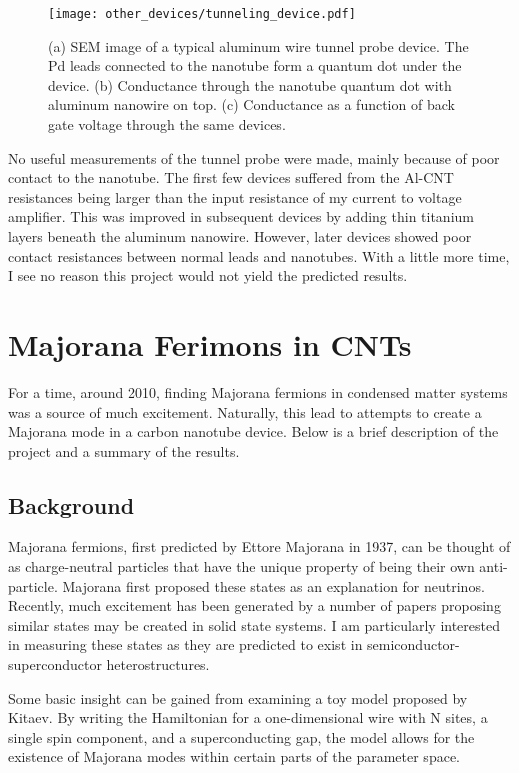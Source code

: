 \begin{figure}
    \centering
    \texttt{[image: other\_devices/tunneling\_device.pdf]}
    \caption{(a) SEM image of a typical aluminum wire tunnel probe device. The Pd leads connected to the nanotube form a quantum dot under the device. (b) Conductance through the nanotube quantum dot with aluminum nanowire on top. (c) Conductance as a function of back gate voltage through the same devices.}
    \label{fig:tunneling_device}
\end{figure}

No useful measurements of the tunnel probe were made, mainly because of poor contact to the nanotube. The first few devices suffered from the Al-CNT resistances being larger than the input resistance of my current to voltage amplifier. This was improved in subsequent devices by adding thin titanium layers beneath the aluminum nanowire. However, later devices showed poor contact resistances between normal leads and nanotubes. With a little more time, I see no reason this project would not yield the predicted results.

\section{Majorana Ferimons in CNTs}
\label{sec:majorana}

For a time, around 2010, finding Majorana fermions in condensed matter systems was a source of much excitement. Naturally, this lead to attempts to create a Majorana mode in a carbon nanotube device. Below is a brief description of the project and a summary of the results.

\subsection{Background}

Majorana fermions, first predicted by Ettore Majorana in 1937\cite{Majorana1937}, can be thought of as charge-neutral particles that have the unique property of being their own anti-particle. Majorana first proposed these states as an explanation for neutrinos. Recently, much excitement has been generated by a number of papers proposing similar states may be created in solid state systems\cite{Lutchyn2010, Alicea2010}. I am particularly interested in measuring these states as they are predicted to exist in semiconductor-superconductor heterostructures.

Some basic insight can be gained from examining a toy model proposed by Kitaev\cite{Kitaev2001}.  By writing the Hamiltonian for a one-dimensional wire with N sites, a single spin component, and a superconducting gap, the model allows for the existence of Majorana modes within certain parts of the parameter space.  

